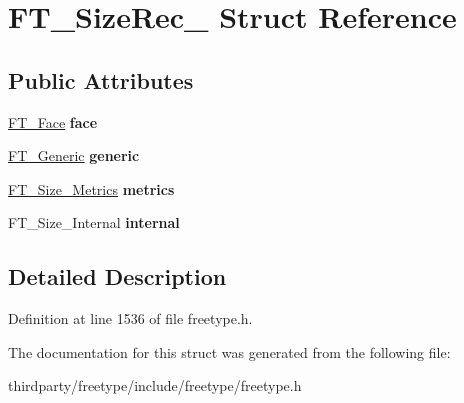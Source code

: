 \hypertarget{struct_f_t___size_rec__}{}\section{F\+T\+\_\+\+Size\+Rec\+\_\+ Struct Reference}
\label{struct_f_t___size_rec__}
\subsection*{Public Attributes}
\begin{DoxyCompactItemize}
\item 
\mbox{\label{struct_f_t___size_rec___a21b54fb07feaba8be23321054da98f5f}} 
\hyperlink{struct_f_t___face_rec__}{F\+T\+\_\+\+Face} {\bfseries face}
\item 
\mbox{\label{struct_f_t___size_rec___aa24520b093a9b4ba9ff388bfe7b9491d}} 
\hyperlink{struct_f_t___generic__}{F\+T\+\_\+\+Generic} {\bfseries generic}
\item 
\mbox{\label{struct_f_t___size_rec___a29a6b518d09f6cf1714d9aed01eddc01}} 
\hyperlink{struct_f_t___size___metrics__}{F\+T\+\_\+\+Size\+\_\+\+Metrics} {\bfseries metrics}
\item 
\mbox{\label{struct_f_t___size_rec___a236c47ea3138e485c29b0d7baa5cf3b6}} 
F\+T\+\_\+\+Size\+\_\+\+Internal {\bfseries internal}
\end{DoxyCompactItemize}


\subsection{Detailed Description}


Definition at line 1536 of file freetype.\+h.



The documentation for this struct was generated from the following file\+:\begin{DoxyCompactItemize}
\item 
thirdparty/freetype/include/freetype/freetype.\+h\end{DoxyCompactItemize}
